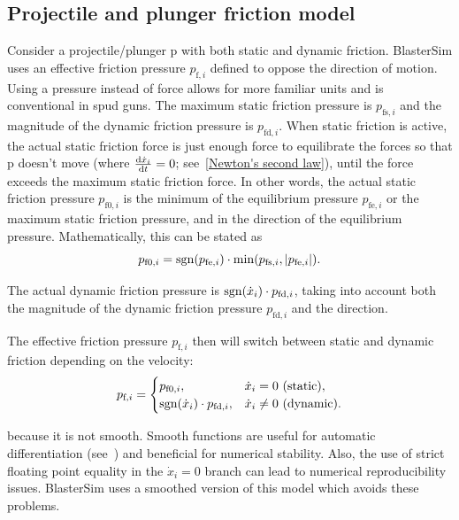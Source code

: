 \subsection{Projectile and plunger friction model}\label{friction}

Consider a projectile/plunger p with both static and dynamic friction.
BlasterSim uses an effective friction pressure $p_{\text{f},i}$ defined to oppose the direction of motion.
Using a pressure instead of force allows for more familiar units and is conventional in spud guns.
The maximum static friction pressure is $p_{\text{fs},i}$ and the magnitude of the dynamic friction pressure is $p_{\text{fd},i}$.
When static friction is active, the actual static friction force is just enough force to equilibrate the forces so that p doesn't move (where $\dv{\dot{x}_i}{t} = 0$; see~\eqref{Newton's second law}), until the force exceeds the maximum static friction force.
In other words, the actual static friction pressure $p_{\text{f0},i}$ is the minimum of the equilibrium pressure $p_{\text{fe},i}$ or the maximum static friction pressure, and in the direction of the equilibrium pressure.
Mathematically, this can be stated as
\begin{equation}
    p_{\text{f0},i} = \operatorname{sgn}(p_{\text{fe},i}) \cdot \min(p_{\text{fs},i}, |p_{\text{fe},i}|). \label{eq:actual static friction min}
\end{equation}

The actual dynamic friction pressure is $\operatorname{sgn}(\dot{x}_i) \cdot p_{\text{fd},i}$, taking into account both the magnitude of the dynamic friction pressure $p_{\text{fd},i}$ and the direction.

The effective friction pressure $p_{\text{f},i}$ then will switch between static and dynamic friction depending on the velocity:
\begin{equation}
    p_{\text{f},i} =
    \begin{cases}
        p_{\text{f0},i},                       & \dot{x}_i = 0~\text{(static)},    \\
        \operatorname{sgn}(\dot{x}_i) \cdot p_{\text{fd},i}, & \dot{x}_i \neq 0~\text{(dynamic)}.
    \end{cases}\label{eq:effective friction pressure cases}
\end{equation}

 because it is not smooth.
Smooth functions are useful for automatic differentiation (see~) and beneficial for numerical stability.
Also, the use of strict floating point equality in the $\dot{x}_i = 0$ branch can lead to numerical reproducibility issues.
BlasterSim uses a smoothed version of this model which avoids these problems.


